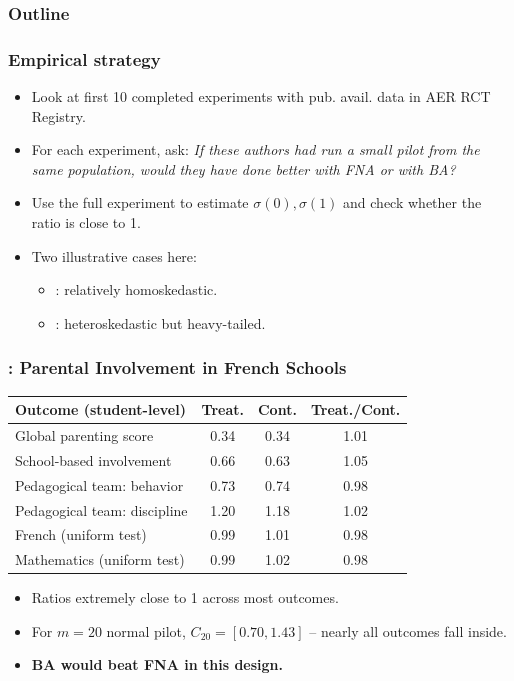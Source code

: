 \documentclass[aspectratio=169, 10pt]{beamer}
\theoremstyle{definition}
\theoremstyle{plain}
\begin{document}
\begin{frame}
  \frametitle{Outline}
  \tableofcontents[currentsection]
\end{frame}

\begin{frame}
\frametitle{Empirical strategy}
\begin{itemize}
  \item Look at first 10 completed experiments with pub. avail. data
    in AER RCT Registry.
    \vfill
  \item For each experiment, ask:
    \emph{If these authors had run a small pilot from the same population,
    would they have done better with FNA or with BA?}
    \vfill
  \item Use the full experiment to estimate \(\sigma(0), \sigma(1)\) and check
    whether the ratio is close to 1.
    \vfill
  \item Two illustrative cases here:
    \vfill
    \begin{itemize}
      \item \citet{2014avvisatiGettingParentsInvolved}: relatively
        homoskedastic.
        \vfill
      \item \citet{2006ashrafTyingOdysseusMast}: heteroskedastic but
        heavy-tailed.
    \end{itemize}
\end{itemize}
\end{frame}

\begin{frame}
\frametitle{\citet{2014avvisatiGettingParentsInvolved}: Parental Involvement in French Schools}
\centering\small
\begin{tabular}{lccc}
\toprule
Outcome (student-level) & Treat. & Cont. & Treat./Cont. \\
\midrule
Global parenting score              & 0.34 & 0.34 & 1.01 \\
School-based involvement            & 0.66 & 0.63 & 1.05 \\
Pedagogical team: behavior          & 0.73 & 0.74 & 0.98 \\
Pedagogical team: discipline        & 1.20 & 1.18 & 1.02 \\
French (uniform test)               & 0.99 & 1.01 & 0.98 \\
Mathematics (uniform test)          & 0.99 & 1.02 & 0.98 \\
\bottomrule
\end{tabular}
\vfill
\begin{itemize}
  \item Ratios extremely close to 1 across most outcomes.
    \vfill
  \item For \(m = 20\) normal pilot, \(C_{20} = [0.70, 1.43]\) -- nearly all
    outcomes fall inside.
    \vfill
  \item \textbf{BA would beat FNA in this design.}
\end{itemize}
\end{frame}
\end{document}

